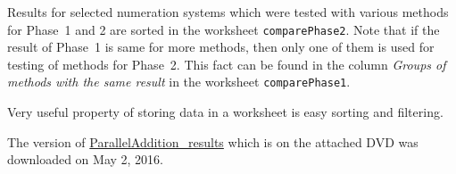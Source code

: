Results for selected numeration systems which were tested with various  methods for Phase~1 and 2 are sorted in the worksheet \verb+comparePhase2+. Note that if the result of Phase~1 is same for more methods, then only one of them is used for testing of methods for Phase~2. This fact can be found in the column \emph{Groups of methods with the same result} in the worksheet \verb+comparePhase1+.

Very useful property of storing data in a worksheet is easy sorting and filtering.

The version of \href{https://docs.google.com/spreadsheets/d/1TnhrHdefHfHa0WSeVs4q6XVj3epjPlPlnoekE0E1xeM/edit?usp=sharing}{ParallelAddition\_results} which is on the attached DVD was downloaded on May 2, 2016.
